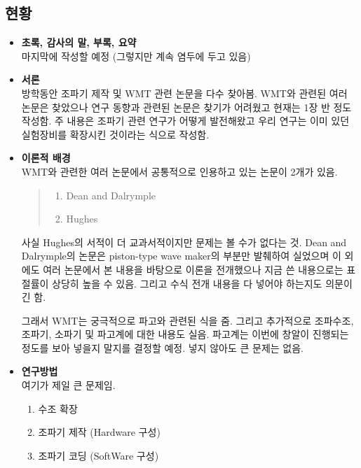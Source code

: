 \subsection{현황}
\begin{itemize}
    \item \textbf{초록, 감사의 말, 부록, 요약}\\
    마지막에 작성할 예정 (그렇지만 계속 염두에 두고 있음)
    
    \item \textbf{서론}\\
    방학동안 조파기 제작 및 WMT 관련 논문을 다수 찾아봄. WMT와 관련된 여러 논문은 찾았으나 연구 동향과 관련된 논문은 찾기가 어려웠고 현재는 1장 반 정도 작성함. 주 내용은 조파기 관련 연구가 어떻게 발전해왔고 우리 연구는 이미 있던 실험장비를 확장시킨 것이라는 식으로 작성함.    

    \item \textbf{이론적 배경}\\
    WMT와 관련한 여러 논문에서 공통적으로 인용하고 있는 논문이 2개가 있음.

    \begin{quote}
        \begin{enumerate}
            \item Dean and Dalrymple
            \item Hughes
        \end{enumerate}
    \end{quote}

    사실 Hughes의 서적이 더 교과서적이지만 문제는 볼 수가 없다는 것. Dean and Dalrymple의 논문은 piston-type wave maker의 부분만 발췌하여 실었으며 이 외에도 여러 논문에서 본 내용을 바탕으로 이론을 전개했으나 지금 쓴 내용으로는 표절률이 상당히 높을 수 있음. 그리고 수식 전개 내용을 다 넣어야 하는지도 의문이긴 함.

    그래서 WMT는 궁극적으로 파고와 관련된 식을 줌. 그리고 추가적으로 조파수조, 조파기, 소파기 및 파고계에 대한 내용도 실음. 파고계는 이번에 창알이 진행되는 정도를 보아 넣을지 말지를 결정할 예정. 넣지 않아도 큰 문제는 없음.

    \item \textbf{연구방법}\\
    여기가 제일 큰 문제임.
    
    \begin{enumerate}
        \item 수조 확장
        \item 조파기 제작 (Hardware 구성)
        \item 조파기 코딩 (SoftWare 구성)
    \end{enumerate}


\end{itemize}
